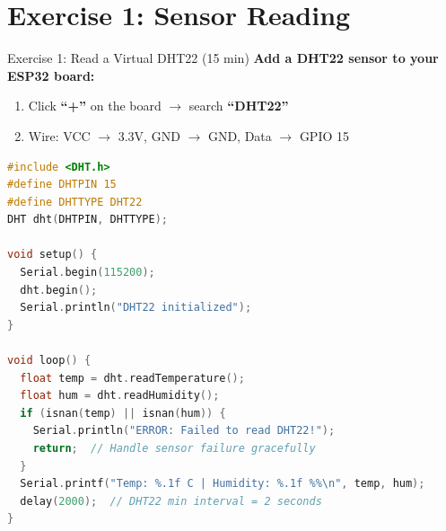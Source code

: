 \documentclass[aspectratio=169,11pt]{beamer}
\begin{document}
\section{Exercise 1: Sensor Reading}

\begin{frame}[fragile]{Exercise 1: Read a Virtual DHT22 (15 min)}
    \textbf{Add a DHT22 sensor to your ESP32 board:}
    \begin{enumerate}
        \item Click \textbf{``+''} on the board $\rightarrow$ search \textbf{``DHT22''}
        \item Wire: VCC $\rightarrow$ 3.3V, GND $\rightarrow$ GND, Data $\rightarrow$ GPIO 15
    \end{enumerate}

    \vspace{0.1cm}
    \begin{lstlisting}[language=C]
#include <DHT.h>
#define DHTPIN 15
#define DHTTYPE DHT22
DHT dht(DHTPIN, DHTTYPE);

void setup() {
  Serial.begin(115200);
  dht.begin();
  Serial.println("DHT22 initialized");
}

void loop() {
  float temp = dht.readTemperature();
  float hum = dht.readHumidity();
  if (isnan(temp) || isnan(hum)) {
    Serial.println("ERROR: Failed to read DHT22!");
    return;  // Handle sensor failure gracefully
  }
  Serial.printf("Temp: %.1f C | Humidity: %.1f %%\n", temp, hum);
  delay(2000);  // DHT22 min interval = 2 seconds
}
    \end{lstlisting}
\end{frame}
\end{document}

